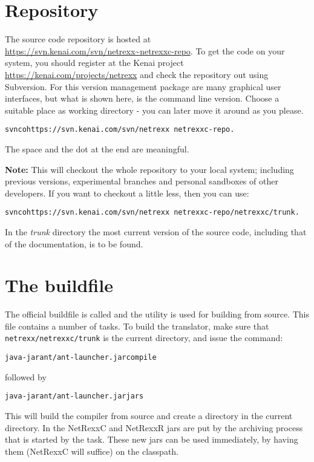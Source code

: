 \section{Repository}
The \nr{} source code repository is hosted at\\
\url{https://svn.kenai.com/svn/netrexx~netrexxc-repo}. To get the code
on your system, you should register at the Kenai project
\url{https://kenai.com/projects/netrexx} and check the repository out
using Subversion. For this version management package are many
graphical user interfaces, but what is shown here, is the command line
version. Choose a suitable place as working directory - you can later
move it around as you please.
\begin{alltt}
svn co https://svn.kenai.com/svn/netrexx~netrexxc-repo .
\end{alltt}
The space and the dot at the end are meaningful. 
\begin{shaded}\noindent
\textbf{Note:} This will checkout
the whole repository to your local system; including previous
versions, experimental branches and personal sandboxes of other
developers. If you want to checkout a little less, then you can use:
\begin{alltt}
svn co https://svn.kenai.com/svn/netrexx~netrexxc-repo/netrexxc/trunk .
\end{alltt}
\end{shaded}\indent
In the \emph{trunk} directory the most current version of the source
code, including that of the documentation, is to be found. 
\section{The buildfile}
The official buildfile is called  and the
 utility is used for building \nr{} from source. This
file contains a number of tasks. To build
the translator, make sure that \texttt{netrexx/netrexxc/trunk} is the
current directory, and issue the command:
\begin{alltt}
java -jar ant/ant-launcher.jar compile
\end{alltt}
followed by
\begin{alltt}
java -jar ant/ant-launcher.jar jars
\end{alltt}
This will build the compiler from source and create a 
directory in the current directory. In  the
NetRexxC and NetRexxR jars are put by the archiving process that is
started by the  task. These new jars can be used
immediately, by having them (NetRexxC will suffice) on the classpath.
